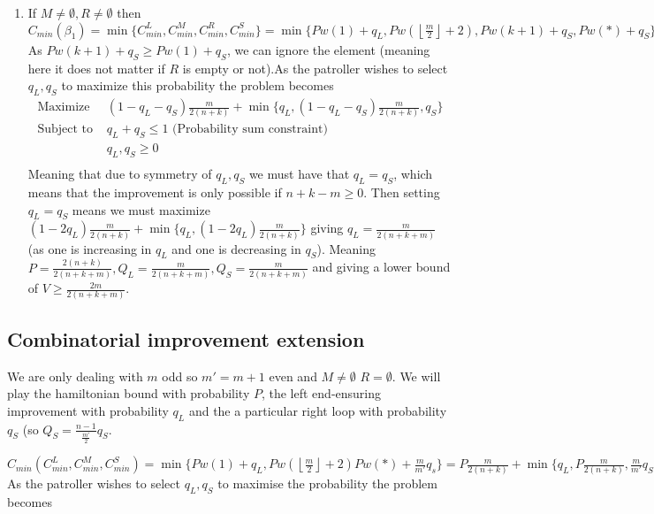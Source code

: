 \documentclass[a4paper,10pt]{article}
\newcommand{\floor}[1]{\left \lfloor #1 \right \rfloor}
\theoremstyle{definition}
\theoremstyle{definition}
\theoremstyle{remark}
\theoremstyle{definition}
\begin{document}
\begin{enumerate}
\item If $M \neq \emptyset , R \neq \emptyset$ then $C_{min} (\beta_{1})=\min \{ C_{min}^{L} , C_{min}^{M} , C_{min}^{R}, C_{min}^{S} \}=\min \{ Pw(1)+q_{L}, Pw(\floor{\frac{m}{2}}+2), Pw(k+1)+q_{S}, Pw(*)+q_{S} \}=\min \{ Pw(1)+q_{L}, Pw(\floor{\frac{m}{2}}+2), Pw(*)+q_{S} \}=P \frac{m}{2(n+k)} + \min \{ q_{L}, P \frac{m}{2(n+k)} , q_{S}  \}$ As $Pw(k+1)+q_{S} \geq Pw(1)+q_{S}$, we can ignore the element (meaning here it does not matter if $R$ is empty or not).As the patroller wishes to select $q_{L},q_{S}$ to maximize this probability the problem becomes
$$\begin{array}{cc}
\text{Maximize} & (1-q_{L}-q_{S}) \frac{m}{2(n+k)} + \min \{ q_{L}, (1-q_{L}-q_{S}) \frac{m}{2(n+k)} , q_{S} \}\\
\text{Subject to } & q_{L}+q_{S} \leq 1 \text{  (Probability sum constraint)} \\
     & q_{L},q_{S} \geq 0 \\
\end{array} $$
Meaning that due to symmetry of $q_{L},q_{S}$ we must have that $q_{L}=q_{S}$, which means that the improvement is only possible if $n+k-m \geq 0$. Then setting $q_{L}=q_{S}$ means we must maximize $(1-2q_{L})\frac{m}{2(n+k)} + \min \{ q_{L} , (1-2q_{L}) \frac{m}{2(n+k)} \}$ giving $q_{L}=\frac{m}{2(n+k+m)}$ (as one is increasing in $q_{L}$ and one is decreasing in $q_{S}$). Meaning $P=\frac{2(n+k)}{2(n+k+m)},Q_{L}=\frac{m}{2(n+k+m)},Q_{S}=\frac{m}{2(n+k+m)}$ and giving a lower bound of $V \geq \frac{2m}{2(n+k+m)}$.
\end{enumerate}

\subsection{Combinatorial improvement extension}
\label{Appendix:Combinatorial extension analysis}
We are only dealing with $m$ odd so $m'=m+1$ even and $M \neq \emptyset$ $R = \emptyset$. We will play the hamiltonian bound with probability $P$, the left end-ensuring improvement with probability $q_{L}$ and the a particular right loop with probability $q_{S}$ (so $Q_{S}=\frac{n-1}{\frac{m'}{2}}q_{S}$.

$C_{min}(C_{min}^{L},C_{min}^M,C_{min}^S)=\min\{Pw(1)+q_{L},Pw(\floor{\frac{m}{2}}+2) Pw(*)+\frac{m}{m'}q_{s}\}=P\frac{m}{2(n+k)}+\min\{q_{L},P\frac{m}{2(n+k)},\frac{m}{m'}q_{S} \}$ As the patroller wishes to select $q_{L},q_{S}$ to maximise the probability the problem becomes
\end{document}
